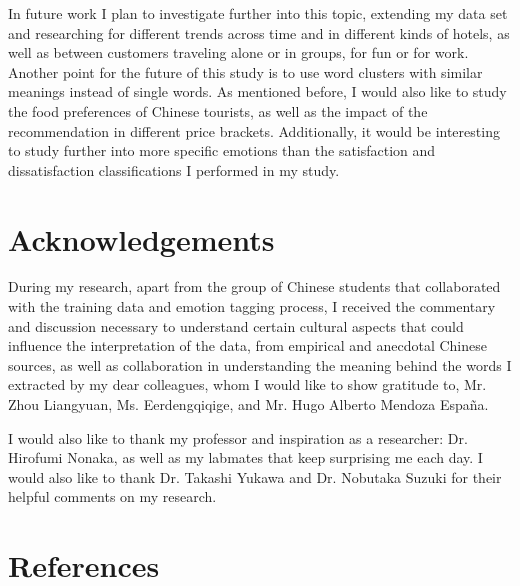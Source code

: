 \documentclass[review]{elsarticle}
\begin{document}
In future work I plan to investigate further into this topic, extending my data set and researching for different trends across time and in different kinds of hotels, as well as between customers traveling alone or in groups, for fun or for work. Another point for the future of this study is to use word clusters with similar meanings instead of single words. As mentioned before, I would also like to study the food preferences of Chinese tourists, as well as the impact of the recommendation in different price brackets. Additionally, it would be interesting to study further into more specific emotions than the satisfaction and dissatisfaction classifications I performed in my study.

\section*{Acknowledgements}

During my research, apart from the group of Chinese students that collaborated with the training data and emotion tagging process, I received the commentary and discussion necessary to understand certain
cultural aspects that could influence the interpretation of the data, from empirical and anecdotal Chinese sources, as well as collaboration in understanding the meaning behind the words I extracted by my dear colleagues, whom I would like to show gratitude to, Mr. Zhou Liangyuan, Ms. Eerdengqiqige, and Mr. Hugo Alberto Mendoza España.

I would also like to thank my professor and inspiration as a researcher: Dr. Hirofumi Nonaka, as well as my labmates that keep surprising me each day. I would also like to thank Dr. Takashi Yukawa and Dr. Nobutaka Suzuki for their helpful comments on my research.

\clearpage
\section*{References}


\end{document}
